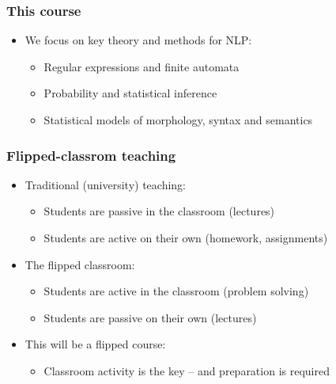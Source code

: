 \documentclass[dvipsnames]{beamer}
\begin{document}
\begin{frame}
\frametitle{This course}

\begin{itemize}
\item We focus on key theory and methods for NLP:
\begin{itemize}
\item Regular expressions and finite automata
\item Probability and statistical inference
\item Statistical models of morphology, syntax and semantics
\end{itemize}
\end{itemize}
\end{frame}

\begin{frame}
\frametitle{Flipped-classrom teaching}
\begin{itemize}
\item Traditional (university) teaching:
\begin{itemize}
\item Students are \alert{passive} in the classroom (lectures)
\item Students are \alert{active} on their own (homework, assignments)
\end{itemize}
\item The flipped classroom:
\begin{itemize}
\item Students are \alert{active} in the classroom (problem solving)
\item Students are \alert{passive} on their own (lectures) %
\end{itemize}
\item This will be a flipped course:
\begin{itemize}
\item Classroom activity is the key -- and preparation is required
\end{itemize}
\end{itemize}
\end{frame}
\end{document}
